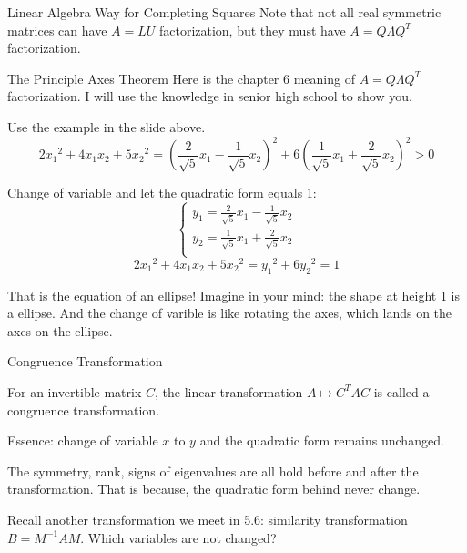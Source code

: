 \documentclass{beamer}
\begin{document}
\begin{frame}{Linear Algebra Way for Completing Squares}
Note that not all real symmetric matrices can have $A=LU$ factorization, but they must have $A=Q\varLambda Q^T$ factorization.

\end{frame}

\begin{frame}{The Principle Axes Theorem}
Here is the chapter 6 meaning of $A=Q\varLambda Q^T$ factorization. I will use the knowledge in senior high school to show you.

\vspace{3pt}
Use the example in the slide above.
\begin{equation*}
    2{x_1}^2+4x_1x_2+5{x_2}^2=\left( \frac{2}{\sqrt{5}}x_1-\frac{1}{\sqrt{5}}x_2 \right) ^2+6\left( \frac{1}{\sqrt{5}}x_1+\frac{2}{\sqrt{5}}x_2 \right) ^2>0
\end{equation*}

Change of variable and let the quadratic form equals 1:
\begin{equation*}
    \begin{cases}
        y_1=\frac{2}{\sqrt{5}}x_1-\frac{1}{\sqrt{5}}x_2\\
        y_2=\frac{1}{\sqrt{5}}x_1+\frac{2}{\sqrt{5}}x_2\\
    \end{cases}
\end{equation*}
\begin{equation*}
    2{x_1}^2+4x_1x_2+5{x_2}^2={y_1}^2+6{y_2}^2=1
\end{equation*}

That is the equation of an ellipse! Imagine in your mind: the shape at height 1 is a ellipse. And the change of varible is like rotating the axes, which lands on the axes on the ellipse.
\end{frame}

\begin{frame}{Congruence Transformation}
\begin{definition}
    For an invertible matrix $C$, the linear transformation $A\mapsto C^TAC$ is called a congruence transformation.
\end{definition}

Essence: change of variable $x$ to $y$ and the quadratic form remains unchanged.

\vspace{3pt}
The symmetry, rank, signs of eigenvalues are all hold before and after the transformation. That is because, the quadratic form behind never change.

\vspace{3pt}
Recall another transformation we meet in 5.6: similarity transformation $B=M^{-1}AM$. Which variables are not changed?
\end{frame}
\end{document}
